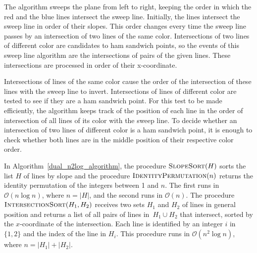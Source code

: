 \documentclass{article}
\def\bigo{\mathcal{O}}
\begin{document}
The algorithm sweeps the plane from left to right, keeping the order in which the red and the blue lines intersect the sweep line. Initially, the lines intersect the sweep line in order of their slopes.  This order changes every time the sweep line passes by an  intersection of two lines of the same color.  Intersections of two lines of different color are candidates to ham sandwich points, so the events of this sweep line algorithm are the intersections of pairs of the given lines.  These intersections are processed in order of their x-coordinate. 

Intersections of lines of the same color cause the order of the intersection of these lines with 
the sweep line to invert.  Intersections of lines of different color are tested to see if they are a ham sandwich point. 
For this test to be made efficiently, the algorithm keeps track of the position of each line in the order of intersection of 
all lines of its color with the sweep line.  To decide whether an intersection of two lines of different color is a ham sandwich 
point, it is enough to check whether both lines are in the middle position of their respective color order. 

\newcommand{\IntersectionSort}{\textsc{IntersectionSort}}
\newcommand{\SlopeSort}{\textsc{SlopeSort}}
\newcommand{\IdPerm}{\textsc{IdentityPermutation}}

In Algorithm~\ref{dual_n2log_algorithm}, the procedure $\SlopeSort(H)$ sorts the list $H$ of lines by slope and the procedure $\IdPerm(n)$ returns the identity permutation of the integers between 1 and $n$.
The first runs in $\bigo(n \log n)$, where $n = |H|$, and the second runs in $\bigo(n)$.
The procedure $\IntersectionSort(H_1,H_2)$ receives two sets $H_1$ and $H_2$ of lines in general position and returns a list of all pairs of lines in~$H_1 \cup H_2$ that intersect, sorted by the $x$-coordinate of the intersection.  Each line is identified by an integer $i$ in $\{1,2\}$ and the index of the line in $H_i$.  This procedure runs in $\bigo(n^2 \log n)$, where $n = |H_1| + |H_2|$.

\newcommand{\Events}{\mathit{Events}}
\end{document}

